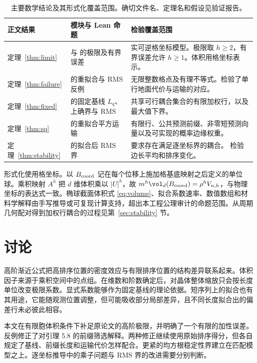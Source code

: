 \documentclass[11pt,a4paper,UTF8,fontset=fandol]{ctexart}
\theoremstyle{definition}
\begin{document}
\begin{table}[htbp]
\small\centering
\caption{主要数学结论及其形式化覆盖范围。确切文件名、定理名和假设见验证报告。}\label{tab:lean}
\begin{tabularx}{\linewidth}{p{.23\linewidth}YY}
\toprule
正文结果 & 模块与 Lean 命题 & 检验覆盖范围\\
\midrule
定理~\ref{thm:limit} &  与  的极限及有界误差 & 实可逆格坐标模型。极限取 \(h\ge2\)，有界误差允许 \(h\ge1\)。体积用格坐标表示。\\
定理~\ref{thm:failure} &  的重拟合与 RMS 反例 & 无限整数格点及有理不等式。检验了单行地面代价与运输的对应。\\
定理~\ref{thm:fixed} &  的固定基线 \(L_q\)、上确界与 RMS & 共享可行耦合集合的有限加权行，以及最大值下界。\\
定理~\ref{thm:sq} &  的重拟合平方运输 & 有限行、公共预测前缀、非零短预测向量以及可实现的概率边缘权重。\\
定理~\ref{thm:stability} &  的拟合后 RMS 界 & 要求存在满足逐坐标界的耦合。 检验边长平均和排序变化。\\
\bottomrule
\end{tabularx}
\end{table}

形式化使用格坐标。以 \(B_{\rm coord}\) 记在每个位移上施加格基底映射之后定义的单位球。乘积映射 \(A^h\) 把 \(d\) 维体积乘以 \(|U|^h\)，故 \(m^h\vol_d(B_{\rm coord})=\rho^h V_{n,h}\)，与物理坐标的表达式一致。椭球截面体积式 \eqref{eq:volume}、拟合系数速率、数值数组和材料学解释由手写推导或可复现计算支持，超出本工程公理审计的命题范围。从周期几何配对得到加权行耦合的过程见第~\ref{sec:stability} 节。

\section{讨论}\label{sec:discussion}

高阶渐近公式把高排序位置的密度效应与有限排序位置的结构差异联系起来。体积因子来源于乘积空间中的点组。在维数和阶数确定后，对晶体整体缩放只会按长度单位改变极限系数。显式系数能够作为固定基线的理论依据。短序列上的拟合也有其用途，它能随观测位置调整，但可能吸收部分局部差异，且不同长度拟合出的偏差行未必彼此相容。

本文在有限胞体积条件下补足原论文的高阶极限，并明确了一个有限的加性误差。反例修正了对引理 5.8 的前缀筛选解释。两种修正继续使用原始排序得分，但各自规定了基线、前缀长度和运输代价怎样配合。更紧的均方根稳定性界建立在匹配模型之上。逐坐标推导中的乘子问题与 RMS 界的改进需要分别判断。
\end{document}
